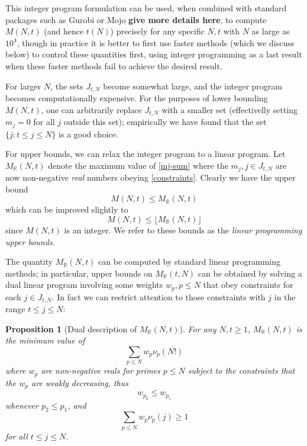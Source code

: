 \documentclass[12pt,a4paper,reqno]{amsart}
\numberwithin{equation}{section}
\theoremstyle{plain}
\newtheorem{proposition}[theorem]{Proposition}
\theoremstyle{definition}
\newcommand\R{\mathbb{R}}
\begin{document}
This integer program formulation can be used, when combined with standard packages such as Gurobi or Mojo {\bf give more details here}, to compute $M(N,t)$ (and hence $t(N)$) precisely for any specific $N,t$ with $N$ as large as $10^4$, though in practice it is better to first use faster methods (which we discuss below) to control these quantities first, using integer programming as a last result when these faster methods fail to achieve the desired result.

For larger $N$, the sets $J_{t,N}$ become somewhat large, and the integer program becomes computationally expensive.  For the purposes of lower bounding $M(N,t)$, one can arbitrarily replace $J_{t,N}$ with a smaller set (effectivelly setting $m_j=0$ for all $j$ outside this set); empirically we have found that the set $\{ j: t \leq j \leq N \}$ is a good choice.

For upper bounds, we can relax the integer program to a linear program.  Let $M_\R(N,t)$ denote the maximum value of \eqref{mj-sum} where the $m_j, j \in J_{t,N}$ are now non-negative \emph{real} numbers obeying \eqref{constraints}.  Clearly we have the upper bound
$$ M(N,t) \leq M_\R(N,t)$$
which can be improved slightly to
\begin{equation}\label{lp-upper} 
  M(N,t) \leq \lfloor M_\R(N,t)\rfloor
\end{equation}
since $M(N,t)$ is an integer.  We refer to these bounds as the \emph{linear programming upper bounds}.

The quantity $M_\R(N,t)$ can be computed by standard linear programming methods; in particular, upper bounds on $M_\R(t,N)$ can be obtained by solving a dual linear program involving some weights $w_p, p \leq N$ that obey constraints for each $j \in J_{t,N}$.  In fact we can restrict attention to those constraints with $j$ in the range $t \leq j \leq N$:

\begin{proposition}[Dual description of $M_\R(N,t)$]\label{dual-desc} For any $N,t \geq 1$, $M_\R(N,t)$ is the minimum value of
\begin{equation}\label{hyp}
    \sum_{p \leq N} w_p \nu_p(N!)
\end{equation}
where $w_p$ are non-negative reals for primes $p \leq N$
subject to the constraints that the $w_p$ are weakly decreasing, thus
\begin{equation}\label{wp-decrease}
w_{p_2} \leq w_{p_1}
\end{equation}
whenever $p_2 \leq p_1$, and 
\begin{equation}\label{pj}
  \sum_{p \leq N} w_p \nu_p(j) \geq 1
 \end{equation}
for all $t \leq j \leq N$.
\end{proposition}
\end{document}
